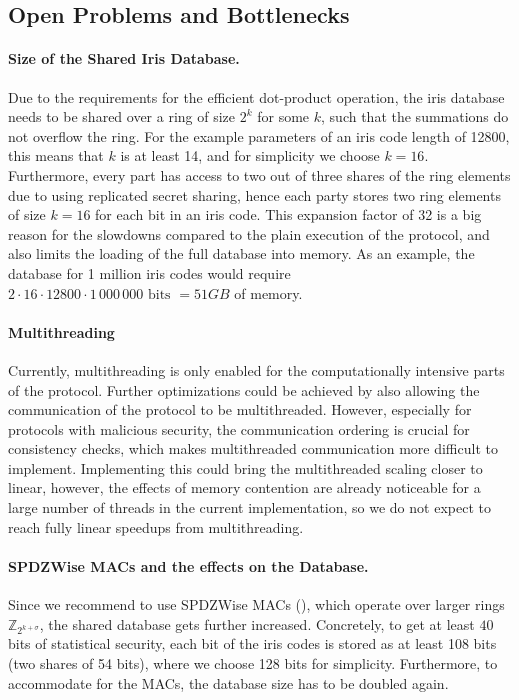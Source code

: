 \documentclass[a4paper,11pt,
]{article}
\newcommand{\Z}{\ensuremath{\mathbb{Z}}\xspace}
\begin{document}
\subsection{Open Problems and Bottlenecks}

\paragraph{Size of the Shared Iris Database.}
Due to the requirements for the efficient dot-product operation, the iris database needs to be shared over a ring of size $2^k$ for some $k$, such that the summations do not overflow the ring.
For the example parameters of an iris code length of 12800, this means that $k$ is at least 14, and for simplicity we choose $k=16$.
Furthermore, every part has access to two out of three shares of the ring elements due to using replicated secret sharing, hence each party stores two ring elements of size $k=16$ for each bit in an iris code.
This expansion factor of 32 is a big reason for the slowdowns compared to the plain execution of the protocol, and also limits the loading of the full database into memory. As an example, the database for 1 million iris codes would require $2 \cdot 16 \cdot 12800 \cdot 1\,000\,000 \text{ bits } = 51 GB$ of memory.

\paragraph{Multithreading}
Currently, multithreading is only enabled for the computationally intensive parts of the protocol. Further optimizations could be achieved by also allowing the communication of the protocol to be multithreaded. However, especially for protocols with malicious security, the communication ordering is crucial for consistency checks, which makes multithreaded communication more difficult to implement. Implementing this could bring the multithreaded scaling closer to linear, however, the effects of memory contention are already noticeable for a large number of threads in the current implementation, so we do not expect to reach fully linear speedups from multithreading.

\paragraph{SPDZWise MACs and the effects on the Database.}
Since we recommend to use SPDZWise MACs (), which operate over larger rings $\Z_{2^{k + \sigma}}$, the shared database gets further increased. Concretely, to get at least $40$ bits of statistical security, each bit of the iris codes is stored as at least 108 bits (two shares of 54 bits), where we choose 128 bits for simplicity. Furthermore, to accommodate for the MACs, the database size has to be doubled again.
\end{document}
